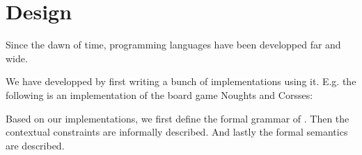 \chapter{Design}
\label{chap:design}


Since the dawn of time, programming languages have been developped far and wide.

We have developped \productname{} by first writing a bunch of implementations
using it. E.g. the following is an implementation of the board game Noughts
and Corsses:


Based on our implementations, we first define the formal grammar of \productname{}.
Then the contextual constraints are informally described. And lastly the formal
semantics are described.










